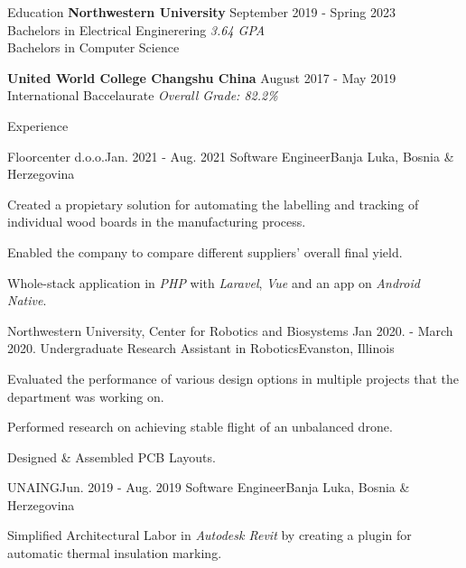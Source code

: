 \documentclass{resume}
\begin{document}
\begin{rSection}{Education}
    {\bf Northwestern University}
    \hfill {September 2019 - Spring 2023} \\ 
    Bachelors in Electrical Enginerering
    \hfill {\em 3.64 GPA} \\
    Bachelors in Computer Science

    {\bf United World College Changshu China}
    \hfill {August 2017 - May 2019} \\
    International Baccelaurate
    \hfill {\em Overall Grade: 82.2\%}
\end{rSection}

\begin{rSection}{Experience}
    \begin{rSubsection}
        {Floorcenter d.o.o.}{Jan. 2021 - Aug. 2021}
        {Software Engineer}{Banja Luka, Bosnia \& Herzegovina}
        \item Created a propietary solution for automating the labelling and
            tracking of individual wood boards in the manufacturing process.
        \item Enabled the company to compare different suppliers' overall final
            yield.
        \item Whole-stack application in \textit{PHP} with \textit{Laravel},
            \textit{Vue} and an app on \textit{Android Native}.
    \end{rSubsection}

    \begin{rSubsection}
        {Northwestern University, Center for Robotics and Biosystems}
        {Jan 2020. - March 2020.}
        {Undergraduate Research Assistant in Robotics}{Evanston, Illinois}
        \item Evaluated the performance of various design options in multiple
            projects that the department was working on.
        \item Performed research on achieving stable flight of an unbalanced
            drone.
        \item Designed \& Assembled PCB Layouts.
    \end{rSubsection}
    
    \begin{rSubsection}
        {UNAING}{Jun. 2019 - Aug. 2019}
        {Software Engineer}{Banja Luka, Bosnia \& Herzegovina}
        \item Simplified Architectural Labor in \textit{Autodesk Revit} by
            creating a plugin for automatic thermal insulation marking.
    \end{rSubsection}


\end{rSection}
\end{document}
